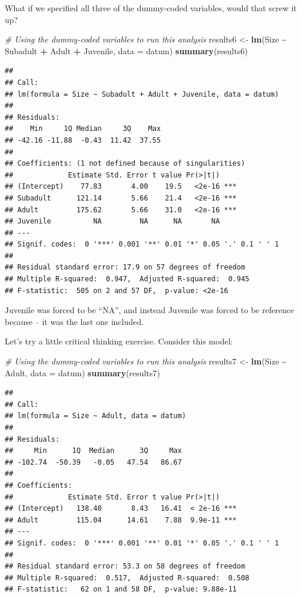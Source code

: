 \documentclass[
]{article}
\newenvironment{Shaded}{\begin{snugshade}}{\end{snugshade}}
\newcommand{\AttributeTok}[1]{\textcolor[rgb]{0.13,0.29,0.53}{#1}}
\newcommand{\CommentTok}[1]{\textcolor[rgb]{0.56,0.35,0.01}{\textit{#1}}}
\newcommand{\FunctionTok}[1]{\textcolor[rgb]{0.13,0.29,0.53}{\textbf{#1}}}
\newcommand{\NormalTok}[1]{#1}
\newcommand{\OtherTok}[1]{\textcolor[rgb]{0.56,0.35,0.01}{#1}}
\newcommand{\SpecialCharTok}[1]{\textcolor[rgb]{0.81,0.36,0.00}{\textbf{#1}}}
\begin{document}
What if we specified all three of the dummy-coded variables, would that
screw it up?

\begin{Shaded}
\begin{Highlighting}[]
\CommentTok{\# Using the dummy{-}coded variables to run this analysis}
\NormalTok{results6 }\OtherTok{\textless{}{-}} \FunctionTok{lm}\NormalTok{(Size }\SpecialCharTok{\textasciitilde{}}\NormalTok{ Subadult }\SpecialCharTok{+}\NormalTok{ Adult }\SpecialCharTok{+}\NormalTok{ Juvenile, }\AttributeTok{data =}\NormalTok{ datum)}
\FunctionTok{summary}\NormalTok{(results6)}
\end{Highlighting}
\end{Shaded}

\begin{verbatim}
## 
## Call:
## lm(formula = Size ~ Subadult + Adult + Juvenile, data = datum)
## 
## Residuals:
##    Min     1Q Median     3Q    Max 
## -42.16 -11.88  -0.43  11.42  37.55 
## 
## Coefficients: (1 not defined because of singularities)
##             Estimate Std. Error t value Pr(>|t|)    
## (Intercept)    77.83       4.00    19.5   <2e-16 ***
## Subadult      121.14       5.66    21.4   <2e-16 ***
## Adult         175.62       5.66    31.0   <2e-16 ***
## Juvenile          NA         NA      NA       NA    
## ---
## Signif. codes:  0 '***' 0.001 '**' 0.01 '*' 0.05 '.' 0.1 ' ' 1
## 
## Residual standard error: 17.9 on 57 degrees of freedom
## Multiple R-squared:  0.947,  Adjusted R-squared:  0.945 
## F-statistic:  505 on 2 and 57 DF,  p-value: <2e-16
\end{verbatim}

Juvenile was forced to be ``NA'', and instead Juvenile was forced to be
reference because -- it was the last one included.

Let's try a little critical thinking exercise. Consider this model:

\begin{Shaded}
\begin{Highlighting}[]
\CommentTok{\# Using the dummy{-}coded variables to run this analysis}
\NormalTok{results7 }\OtherTok{\textless{}{-}} \FunctionTok{lm}\NormalTok{(Size }\SpecialCharTok{\textasciitilde{}}\NormalTok{ Adult, }\AttributeTok{data =}\NormalTok{ datum)}
\FunctionTok{summary}\NormalTok{(results7)}
\end{Highlighting}
\end{Shaded}

\begin{verbatim}
## 
## Call:
## lm(formula = Size ~ Adult, data = datum)
## 
## Residuals:
##     Min      1Q  Median      3Q     Max 
## -102.74  -50.39   -0.05   47.54   86.67 
## 
## Coefficients:
##             Estimate Std. Error t value Pr(>|t|)    
## (Intercept)   138.40       8.43   16.41  < 2e-16 ***
## Adult         115.04      14.61    7.88  9.9e-11 ***
## ---
## Signif. codes:  0 '***' 0.001 '**' 0.01 '*' 0.05 '.' 0.1 ' ' 1
## 
## Residual standard error: 53.3 on 58 degrees of freedom
## Multiple R-squared:  0.517,  Adjusted R-squared:  0.508 
## F-statistic:   62 on 1 and 58 DF,  p-value: 9.88e-11
\end{verbatim}
\end{document}
